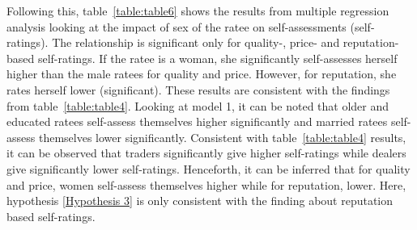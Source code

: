 \documentclass[12pt,english]{article}\usepackage[]{graphicx}\usepackage[]{color}
\begin{document}
Following this, table~\ref{table:table6} shows the results from multiple
regression analysis looking at the impact of sex of the ratee on self-assessments
(self-ratings). The relationship is significant only for quality-,
price- and reputation-based self-ratings. If the ratee is a woman,
she significantly self-assesses herself higher than the male ratees
for quality and price. However, for reputation, she rates herself
lower (significant). These results are consistent with the findings
from table~\ref{table:table4}. Looking at model 1, it can be noted
that older and educated ratees self-assess themselves higher significantly
and married ratees self-assess themselves lower significantly. Consistent
with table~\ref{table:table4} results, it can be observed that traders
significantly give higher self-ratings while dealers give significantly
lower self-ratings. Henceforth, it can be inferred that for quality
and price, women self-assess themselves higher while for reputation,
lower. Here, hypothesis \ref{Hypothesis 3} is only consistent with
the finding about reputation based self-ratings. 
\end{document}
